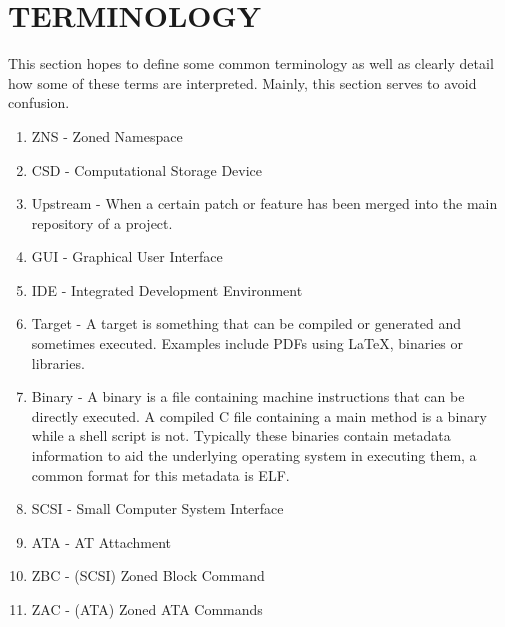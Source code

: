 \documentclass[conference]{IEEEtran}
\newcommand\bashstyle{
	\lstset{
		language=Bash,
		basicstyle=\ttm,
		showstringspaces=false,
		tabsize=2,
		aboveskip=0.2cm,
		belowskip=0.2cm,
		prebreak=\textbackslash,
		extendedchars=true,
		mathescape=false,
		linewidth=8.85cm,
		breaklines=true
	}
}
\newcommand\bashexternal[2][]{{\bashstyle}}
\newcommand\cstyle{
	\lstset{
		language=c,
		basicstyle=\ttm,
		showstringspaces=false,
		tabsize=4,
		aboveskip=0.2cm,
		belowskip=0.2cm,
		otherkeywords={self},             %
		keywordstyle=\ttb\color{deepblue},
		emph={MyClass,__init__},          %
		emphstyle=\ttb\color{deepred},    %
		stringstyle=\color{deepgreen},
		frame=tb,                          %
		prebreak=\textbackslash,
		linewidth=8.85cm,
		breaklines=true,
	}
}
\newcommand\cexternal[2][]{{\cstyle}}
\begin{document}
%



\section*{TERMINOLOGY} \label{term}

This section hopes to define some common terminology as well as clearly detail
how some of these terms are interpreted. Mainly, this section serves to avoid
confusion.

\begin{enumerate}
	\item ZNS      - Zoned Namespace
	\item CSD      - Computational Storage Device
	\item Upstream - When a certain patch or feature has been merged into the
					 main repository of a project.
	\item GUI      - Graphical User Interface
	\item IDE      - Integrated Development Environment
	\item Target   - A target is something that can be compiled or generated and
					 sometimes executed. Examples include PDFs using LaTeX,
					 binaries or libraries.
	\item Binary   - A binary is a file containing machine instructions that can
					 be directly executed. A compiled C file containing a main
					 method is a binary while a shell script is not. Typically
					 these binaries contain metadata information to aid the
					 underlying operating system in executing them, a common
					 format for this metadata is ELF.
	\item SCSI     - Small Computer System Interface
	\item ATA      - AT Attachment
	\item ZBC      - (SCSI) Zoned Block Command
	\item ZAC      - (ATA) Zoned ATA Commands
\end{enumerate}
\end{document}
